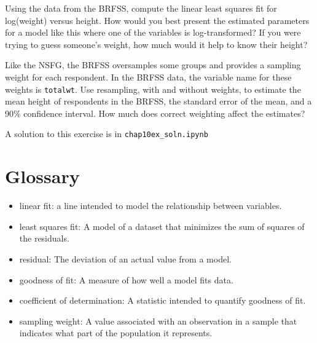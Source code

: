 \documentclass[12pt]{book}
\begin{document}
\begin{exercise}

Using the data from the BRFSS, compute the linear least squares
fit for log(weight) versus height.
How would you best present the estimated parameters for a model
like this where one of the variables is log-transformed?
If you were trying to guess
someone's weight, how much would it help to know their height?

Like the NSFG, the BRFSS oversamples some groups and provides
a sampling weight for each respondent.  In the BRFSS data, the variable
name for these weights is {\tt totalwt}.
Use resampling, with and without weights, to estimate the mean height
of respondents in the BRFSS, the standard error of the mean, and a
90\% confidence interval.  How much does correct weighting affect the
estimates?

A solution to this exercise is in \verb"chap10ex_soln.ipynb"

\end{exercise}


\section{Glossary}

\begin{itemize}

\item linear fit: a line intended to model the relationship between
variables.  

\item least squares fit: A model of a dataset that minimizes the
sum of squares of the residuals.

\item residual: The deviation of an actual value from a model.

\item goodness of fit: A measure of how well a model fits data.

\item coefficient of determination: A statistic intended to
quantify goodness of fit.

\item sampling weight: A value associated with an observation in a
  sample that indicates what part of the population it represents.

\end{itemize}
\end{document}

